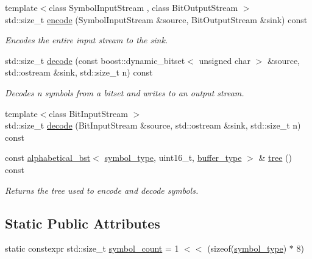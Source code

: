 \begin{DoxyCompactItemize}
{\footnotesize template$<$class Symbol\+Input\+Stream , class Bit\+Output\+Stream $>$ }\\std\+::size\+\_\+t \mbox{\hyperlink{classirk_1_1hutucker__codec_a3f0df69a4d865e5f1e89e90b4f250dae}{encode}} (Symbol\+Input\+Stream \&source, Bit\+Output\+Stream \&sink) const
\begin{DoxyCompactList}\small\item\em Encodes the entire input stream to the sink. \end{DoxyCompactList}\item 
std\+::size\+\_\+t \mbox{\hyperlink{classirk_1_1hutucker__codec_a4c5bc826a54ecf8cc9ce94b61396370f}{decode}} (const boost\+::dynamic\+\_\+bitset$<$ unsigned char $>$ \&source, std\+::ostream \&sink, std\+::size\+\_\+t n) const
\begin{DoxyCompactList}\small\item\em Decodes {\ttfamily n} symbols from a bitset and writes to an output stream. \end{DoxyCompactList}\item 
{\footnotesize template$<$class Bit\+Input\+Stream $>$ }\\std\+::size\+\_\+t \mbox{\hyperlink{classirk_1_1hutucker__codec_a49ca7c3ce227aada3ed65afb3a8444ec}{decode}} (Bit\+Input\+Stream \&source, std\+::ostream \&sink, std\+::size\+\_\+t n) const
\item 
const \mbox{\hyperlink{classirk_1_1alphabetical__bst}{alphabetical\+\_\+bst}}$<$ \mbox{\hyperlink{classirk_1_1hutucker__codec_af23dee5959ae2a69eea0ab324cf6ecb6}{symbol\+\_\+type}}, uint16\+\_\+t, \mbox{\hyperlink{classirk_1_1hutucker__codec_a995378c8c253dae9867a4b1762eeaf95}{buffer\+\_\+type}} $>$ \& \mbox{\hyperlink{classirk_1_1hutucker__codec_a68886f66b539effd689bd54ccf591db1}{tree}} () const
\begin{DoxyCompactList}\small\item\em Returns the tree used to encode and decode symbols. \end{DoxyCompactList}\end{DoxyCompactItemize}
\subsection*{Static Public Attributes}
\begin{DoxyCompactItemize}
\item 
static constexpr std\+::size\+\_\+t \mbox{\hyperlink{classirk_1_1hutucker__codec_a4b583dcfd72280bb0178cd8cf2845e34}{symbol\+\_\+count}} = 1 $<$$<$ (sizeof(\mbox{\hyperlink{classirk_1_1hutucker__codec_af23dee5959ae2a69eea0ab324cf6ecb6}{symbol\+\_\+type}}) $\ast$ 8)
\end{DoxyCompactItemize}


